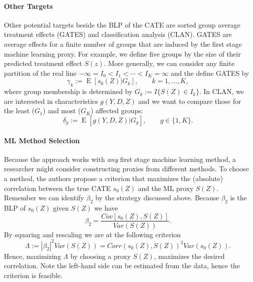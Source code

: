 \documentclass[11pt, a4paper, leqno]{article}
\DeclareMathOperator{\E}{E}
\begin{document}
\paragraph*{Other Targets}
Other potential targets beside the BLP of the CATE are sorted group average treatment effects (GATES) and classification analysis (CLAN).
GATES are average effects for a finite number of groups that are induced by the first stage machine learning proxy.
For example, we define five groups by the size of their predicted treatment effect $S(z)$.
More generally, we can consider any finite partition of the real line $-\infty = I_0 < I_1 < \cdots < I_K = \infty$ and the define GATES by
\begin{equation*}
    \gamma_k := \E[s_0(Z)|G_k], \qquad k=1,\ldots,K,
\end{equation*}
where group membership is determined by $G_k := I\{S(Z) \in I_k\}$.
In CLAN, we are interested in characteristics $g(Y, D, Z)$ and we want to compare those for the least ($G_1$) and most ($G_K$) affected groups:
\begin{equation*}
    \delta_g := \E[g(Y, D, Z)|G_g], \qquad g \in \{1, K\}.
\end{equation*}

\paragraph*{ML Method Selection}
Because the approach works with \textit{any} first stage machine learning method, a researcher might consider constructing proxies from different methods.
To choose a method, the authors propose a criterion that maximizes the (absolute) correlation between the true CATE $s_0(Z)$ and the ML proxy $S(Z)$.
Remember we can identify $\beta_2$ by the strategy discussed above. Because $\beta_2$ is the BLP of $s_0(Z)$ given $S(Z)$ we have
\begin{equation*}
    \beta_2 = \frac{Cov[s_0(Z), S(Z)]}{Var(S(Z))}.
\end{equation*}
By squaring and rescaling we are at the following criterion
\begin{equation*}
    \Lambda := |\beta_2|^2 Var(S(Z)) = Corr(s_0(Z), S(Z))^2 Var(s_0(Z)).
\end{equation*}
Hence, maximizing $\Lambda$ by choosing a proxy $S(Z)$, maximizes the desired correlation.
Note the left-hand side can be estimated from the data, hence the criterion is feasible.
\end{document}

